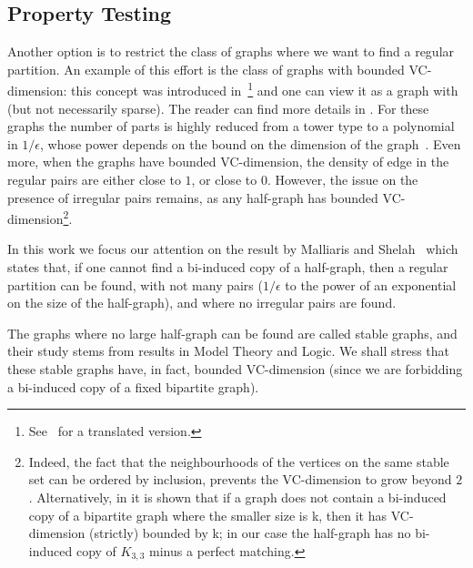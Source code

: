     \subsection{Property Testing}



    Another option is to restrict the class of graphs where we want to find a regular partition.
    An example of this effort is the class of graphs with bounded VC-dimension: this concept was introduced
    in~\cite{the_uniform_convergence_of_frequencies_of_the_appearance_of_events_to_their_probabilities}\footnote{
        See~\cite{on_the_uniform_convergence_of_relative_frequencies_of_events_to_their_probabilities}
        for a translated version.}
    and one can view it as a graph with  (but not necessarily sparse).
    The reader can find more details in .
    For these graphs the number of parts is highly reduced from a tower type to a polynomial in $1/\epsilon$, whose
    power depends on the bound on the dimension of the graph~\cite{regularity_partitions_and_the_topology_of_graphons,
        erdos_hajnal_conjecture_for_graphs_with_bounded_vc_dimension,
        efficient_testing_of_bipartite_graphs_for_forbidden_induced_subgraphs}.
    Even more, when the graphs have bounded VC-dimension, the density of edge in the regular pairs are either close to $1$,
    or close to $0$.
    However, the issue on the presence of irregular pairs remains, as any half-graph has bounded VC-dimension\footnote{
        Indeed, the fact that the neighbourhoods of the vertices on the same stable set can be ordered by inclusion,
        prevents the VC-dimension to grow beyond $2$.
        Alternatively, in \cite{regularity_partitions_and_the_topology_of_graphons} it is shown that if a graph does not
        contain a bi-induced copy of a bipartite graph where the smaller size is k, then it has VC-dimension (strictly)
        bounded by k; in our case the half-graph has no bi-induced copy of $K_{3,3}$ minus a perfect matching.}.

    In this work we focus our attention on the result by Malliaris and Shelah~\cite{regularity_lemmas_for_stable_graphs,
        notes_on_the_stable_regularity_lemma}
    which states that, if one cannot find a bi-induced copy of a half-graph, then a regular partition can be found, with
    not many pairs ($1/\epsilon$ to the power of an exponential on the size of the half-graph), and where no irregular
    pairs are found.

    The graphs where no large half-graph can be found are called stable graphs, and their study stems from results in
    Model Theory and Logic.
    We shall stress that these stable graphs have, in fact, bounded VC-dimension (since we are forbidding a bi-induced
    copy of a fixed bipartite graph).

